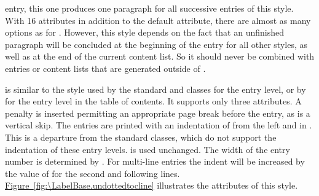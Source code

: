 \begin{description}
  entry, this one produces one paragraph for all successive entries of this
  style. With
  16 attributes in addition to the default 
  attribute, there are almost as many options as for
  . However, this style depends on the fact that an unfinished
  paragraph will be concluded at the beginning of the entry for all other
  styles, as well as at the end of the current content list. So it should
  never be combined with entries or content lists that are generated outside
  of .
\item[\PValue{undottedtocline}] is similar to the style used by the standard
   and  classes for the  entry
  level, or by  for the  entry level in the
  table of contents. It supports only three attributes. A penalty is inserted permitting
  an appropriate page break before the entry, as is a vertical skip. The
  entries are printed with an indentation of  from the left and
  in . This is a departure from the standard classes, which do
  not support the indentation of these entry levels.
   is used unchanged. The width of the
  entry number is determined by . For multi-line entries the
  indent will be increased by the value of  for the second
  and following lines. \hyperref[fig:\LabelBase.undottedtocline]%
  {Figure~\ref*{fig:\LabelBase.undottedtocline}} illustrates the attributes of
  this style.
  \begin{figure}
    \centering
\end{figure}
\end{description}
